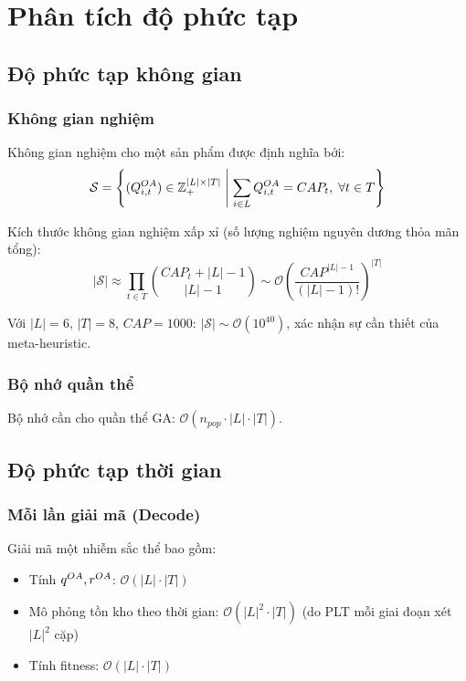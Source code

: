 
\section{Phân tích độ phức tạp}

\subsection{Độ phức tạp không gian}

\subsubsection*{Không gian nghiệm}

Không gian nghiệm cho một sản phẩm được định nghĩa bởi:
\[
\mathcal{S} = \left\{ (Q^{OA}_{i,t}) \in \mathbb{Z}_+^{|L| \times |T|} \;\middle|\; \sum_{i \in L} Q^{OA}_{i,t} = CAP_t, \; \forall t \in T \right\}
\]

Kích thước không gian nghiệm xấp xỉ (số lượng nghiệm nguyên dương thỏa mãn tổng):
\[
|\mathcal{S}| \approx \prod_{t \in T} \binom{CAP_t + |L| - 1}{|L| - 1} \sim \mathcal{O}\!\left(\frac{CAP^{|L|-1}}{(|L|-1)!}\right)^{|T|}
\]

Với $|L|=6$, $|T|=8$, $CAP=1000$: $|\mathcal{S}| \sim \mathcal{O}(10^{40})$, xác nhận sự cần thiết của meta-heuristic.

\subsubsection*{Bộ nhớ quần thể}

Bộ nhớ cần cho quần thể GA: $\mathcal{O}(n_{pop} \cdot |L| \cdot |T|)$.

\subsection{Độ phức tạp thời gian}

\subsubsection*{Mỗi lần giải mã (Decode)}

Giải mã một nhiễm sắc thể bao gồm:
\begin{itemize}
  \item Tính $q^{OA}, r^{OA}$: $\mathcal{O}(|L| \cdot |T|)$
  \item Mô phỏng tồn kho theo thời gian: $\mathcal{O}(|L|^2 \cdot |T|)$ (do PLT mỗi giai đoạn xét $|L|^2$ cặp)
  \item Tính fitness: $\mathcal{O}(|L| \cdot |T|)$
\end{itemize}

